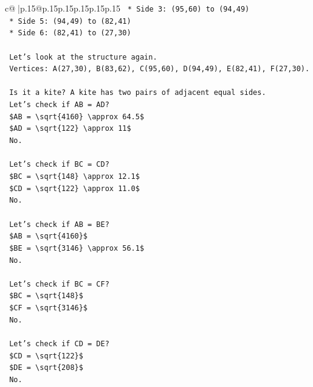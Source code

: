 \documentclass{article}
\begin{document}
{\begin{supertabular}{c@{$\;$}|p{.15\linewidth}@{}p{.15\linewidth}p{.15\linewidth}p{.15\linewidth}p{.15\linewidth}p{.15\linewidth}}
{{{\texttt{        *   Side 3: (95,60) to (94,49)} \\
\texttt{        *   Side 5: (94,49) to (82,41)} \\
\texttt{        *   Side 6: (82,41) to (27,30)} \\
\\ 
\texttt{    Let's look at the structure again.} \\
\texttt{    Vertices: A(27,30), B(83,62), C(95,60), D(94,49), E(82,41), F(27,30).} \\
\\ 
\texttt{    Is it a kite? A kite has two pairs of adjacent equal sides.} \\
\texttt{    Let's check if AB = AD?} \\
\texttt{    \$AB = \textbackslash{}sqrt\{4160\} \textbackslash{}approx 64.5\$} \\
\texttt{    \$AD = \textbackslash{}sqrt\{122\} \textbackslash{}approx 11\$} \\
\texttt{    No.} \\
\\ 
\texttt{    Let's check if BC = CD?} \\
\texttt{    \$BC = \textbackslash{}sqrt\{148\} \textbackslash{}approx 12.1\$} \\
\texttt{    \$CD = \textbackslash{}sqrt\{122\} \textbackslash{}approx 11.0\$} \\
\texttt{    No.} \\
\\ 
\texttt{    Let's check if AB = BE?} \\
\texttt{    \$AB = \textbackslash{}sqrt\{4160\}\$} \\
\texttt{    \$BE = \textbackslash{}sqrt\{3146\} \textbackslash{}approx 56.1\$} \\
\texttt{    No.} \\
\\ 
\texttt{    Let's check if BC = CF?} \\
\texttt{    \$BC = \textbackslash{}sqrt\{148\}\$} \\
\texttt{    \$CF = \textbackslash{}sqrt\{3146\}\$} \\
\texttt{    No.} \\
\\ 
\texttt{    Let's check if CD = DE?} \\
\texttt{    \$CD = \textbackslash{}sqrt\{122\}\$} \\
\texttt{    \$DE = \textbackslash{}sqrt\{208\}\$} \\
\texttt{    No.} \\
}}}
\end{supertabular}}
\end{document}
